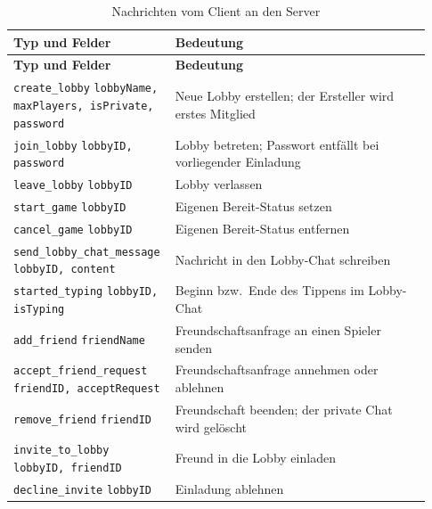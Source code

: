 {\sffamily\footnotesize
\begin{longtable}{p{0.33\linewidth}p{0.6\linewidth}}
  \caption{Nachrichten vom Client an den Server}\label{tab:protokoll-req}\\
  \toprule
  \textbf{Typ und Felder} & \textbf{Bedeutung} \\
  \midrule
  \endfirsthead
  \toprule
  \textbf{Typ und Felder} & \textbf{Bedeutung} \\
  \midrule
  \endhead
  \texttt{create\_lobby} \newline \texttt{lobbyName, maxPlayers, isPrivate, password} & Neue Lobby erstellen; der Ersteller wird erstes Mitglied \\
  \texttt{join\_lobby} \newline \texttt{lobbyID, password} & Lobby betreten; Passwort entfällt bei vorliegender Einladung \\
  \texttt{leave\_lobby} \newline \texttt{lobbyID} & Lobby verlassen \\
  \texttt{start\_game} \newline \texttt{lobbyID} & Eigenen Bereit-Status setzen \\
  \texttt{cancel\_game} \newline \texttt{lobbyID} & Eigenen Bereit-Status entfernen \\
  \texttt{send\_lobby\_chat\_message} \newline \texttt{lobbyID, content} & Nachricht in den Lobby-Chat schreiben \\
  \texttt{started\_typing} \newline \texttt{lobbyID, isTyping} & Beginn bzw.\ Ende des Tippens im Lobby-Chat \\
  \texttt{add\_friend} \newline \texttt{friendName} & Freundschaftsanfrage an einen Spieler senden \\
  \texttt{accept\_friend\_request} \newline \texttt{friendID, acceptRequest} & Freundschaftsanfrage annehmen oder ablehnen \\
  \texttt{remove\_friend} \newline \texttt{friendID} & Freundschaft beenden; der private Chat wird gelöscht \\
  \texttt{invite\_to\_lobby} \newline \texttt{lobbyID, friendID} & Freund in die Lobby einladen \\
  \texttt{decline\_invite} \newline \texttt{lobbyID} & Einladung ablehnen \\

\end{longtable}}
